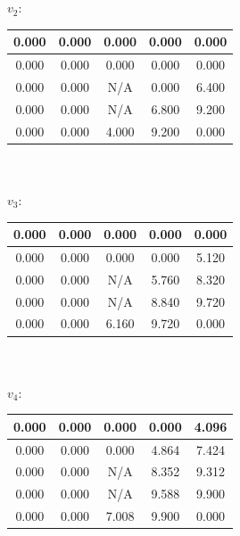 \documentclass{article}
\begin{document}
\begin{enumerate}
\begin{tabular}{|c|c|c|c|c|}
\end{tabular} \\\\

$v_2$:

 \begin{tabular}{|c|c|c|c|c|}

     \hline
      0.000 & 0.000 & 0.000 & 0.000 & 0.000  \\
    \hline
    0.000 & 0.000 & 0.000 & 0.000 & 0.000  \\
    \hline
     0.000 & 0.000 &  N/A & 0.000 & 6.400  \\
    \hline
     0.000 & 0.000 &  N/A & 6.800 & 9.200  \\
    \hline
    0.000 & 0.000 & 4.000 & 9.200 & 0.000  \\
    \hline

\end{tabular} \\\\

$v_3$:

 \begin{tabular}{|c|c|c|c|c|}

     \hline
      0.000 & 0.000 & 0.000 & 0.000 & 0.000  \\
    \hline
    0.000 & 0.000 & 0.000 & 0.000 & 5.120  \\
    \hline
     0.000 & 0.000 &  N/A & 5.760 & 8.320  \\
    \hline
     0.000 & 0.000 &  N/A & 8.840 & 9.720  \\
    \hline
    0.000 & 0.000 & 6.160 & 9.720 & 0.000  \\
    \hline

\end{tabular} \\\\

$v_4$:

 \begin{tabular}{|c|c|c|c|c|}

     \hline
      0.000 & 0.000 & 0.000 & 0.000 & 4.096  \\
    \hline
    0.000 & 0.000 & 0.000 & 4.864 & 7.424  \\
    \hline
     0.000 & 0.000 &  N/A & 8.352 & 9.312  \\
    \hline
     0.000 & 0.000 &  N/A & 9.588 & 9.900  \\
    \hline
    0.000 & 0.000 & 7.008 & 9.900 & 0.000  \\
    \hline


\end{tabular}
\end{enumerate}
\end{document}
